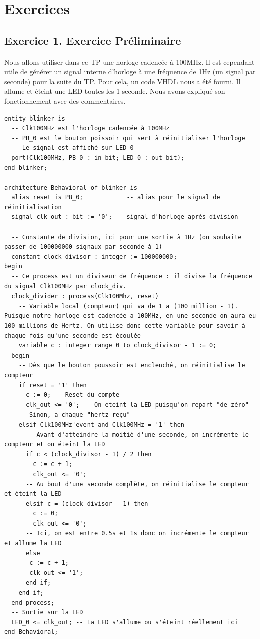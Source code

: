 \chapter{Exercices}
\section{Exercice 1. Exercice Préliminaire}
\label{sec1}

Nous allons utiliser dans ce TP une horloge cadencée à 100MHz. Il est cependant utile de générer un signal interne d'horloge à une fréquence de 1Hz (un signal par seconde) pour la suite du TP. Pour cela, un code VHDL nous a été fourni. Il allume et éteint une LED toutes les 1 seconde. Nous avons expliqué son fonctionnement avec des commentaires.

\vhdl
\begin{lstlisting}
entity blinker is
  -- Clk100MHz est l'horloge cadencée à 100MHz
  -- PB_0 est le bouton poissoir qui sert à réinitialiser l'horloge
  -- Le signal est affiché sur LED_0
  port(Clk100MHz, PB_0 : in bit; LED_0 : out bit);
end blinker;

architecture Behavioral of blinker is
  alias reset is PB_0;            -- alias pour le signal de réinitialisation
  signal clk_out : bit := '0'; -- signal d'horloge après division

  -- Constante de division, ici pour une sortie à 1Hz (on souhaite passer de 100000000 signaux par seconde à 1)
  constant clock_divisor : integer := 100000000;
begin
  -- Ce process est un diviseur de fréquence : il divise la fréquence du signal Clk100MHz par clock_div.
  clock_divider : process(Clk100Mhz, reset)
    -- Variable local (compteur) qui va de 1 a (100 million - 1). Puisque notre horloge est cadencée a 100MHz, en une seconde on aura eu 100 millions de Hertz. On utilise donc cette variable pour savoir à chaque fois qu'une seconde est écoulée
    variable c : integer range 0 to clock_divisor - 1 := 0;
  begin
    -- Dès que le bouton poussoir est enclenché, on réinitialise le compteur
    if reset = '1' then
      c := 0; -- Reset du compte
      clk_out <= '0'; -- On eteint la LED puisqu'on repart "de zéro"
    -- Sinon, a chaque "hertz reçu"
    elsif Clk100MHz'event and Clk100MHz = '1' then
      -- Avant d'atteindre la moitié d'une seconde, on incrémente le compteur et on éteint la LED
      if c < (clock_divisor - 1) / 2 then
        c := c + 1;
        clk_out <= '0';
      -- Au bout d'une seconde complète, on réinitialise le compteur et éteint la LED
      elsif c = (clock_divisor - 1) then
        c := 0;
        clk_out <= '0';
      -- Ici, on est entre 0.5s et 1s donc on incrémente le compteur et allume la LED
      else
       c := c + 1;
       clk_out <= '1';
      end if;
    end if;
  end process;
  -- Sortie sur la LED
  LED_0 <= clk_out; -- La LED s'allume ou s'éteint réellement ici
end Behavioral;
\end{lstlisting}

